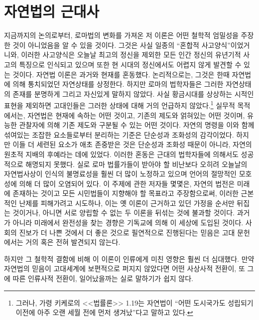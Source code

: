 \chapter{자연법의 근대사}

지금까지의 논의로부터, 로마법의 변화를 가져온 저 이론은 어떤 철학적 엄밀성을
주장한 것이 아니었음을 알 수 있을 것이다.
그것은 사실 일종의 ``혼합적 사고양식''이었거니와,
이러한 사고양식은 오늘날 최고의 정신을 제외한 모든 인간 정신의 유년기적 사고의
특징으로 인식되고 있으며 또한 현 시대의 정신에서도 어렵지 않게
발견할 수 있는 것이다.
자연법 이론은 과거와 현재를 혼동했다.
논리적으로는, 그것은 한때 자연법에 의해 통치되었던 자연상태를 상정한다.
하지만 로마의 법학자들은 그러한 자연상태의 존재를 분명하게 그리고
자신있게 말하지 않았다. 사실 황금시대를 상상하는 시적인 표현을
제외하면 고대인들은 그러한 상태에 대해 거의 언급하지 않았다.\footnote{%
  그러나, 가령 키케로의 <<법률론>> 1.19는 자연법이
  ``어떤 도시국가도 성립되기 이전에 아주 오랜 세월 전에 먼저
  생겨났''다고 말하고 있다. }
실무적 목적에서는, 자연법은 현재에 속하는 어떤 것이고,
기존의 제도와 얽혀있는 어떤 것이며, 유능한 관찰자에 의해
기존 제도와 구분될 수 있는 어떤 것이다.
자연의 명령을 이와 함께 섞여있는 조잡한 요소들로부터 분리하는 기준은
단순성과 조화성의 감각이었다.
하지만 이들 더 세련된 요소가 애초 존중받은 것은
단순성과 조화성 때문이 아니라,
자연의 원초적 지배의 후예라는 데에 있었다.
이러한 혼동은 근대의 법학자들에 의해서도 성공적으로 해명되지 못했다.
실로
로마 법률가들이 받아야 할 비난보다 오히려
오늘날의 자연법사상이 인식의 불명료성을 훨씬 더 많이 노정하고 있으며
언어의 절망적인 모호성에 의해 더 많이 오염되어 있다.
이 주제에 관한 저자들 몇몇은, 자연의 법전은 미래에 존재하는 것이고
모든 시민법들이 지향해야 할 목표라고 주장함으로써,
이러한 근본적인 난제를 피해가려고 시도하나,
이는 옛 이론이 근거하고 있던 가정을 순서만 뒤집는 것이거나,
아니면 서로 양립할 수 없는 두 이론을 뒤섞는 것에 불과할 것이다.
과거가 아니라 미래에서 완전성을 찾는 경향은 기독교에 의해
이 세상에 도입된 것이다.
사회의 진보가 더 나쁜 것에서 더 좋은 것으로 필연적으로 진행된다는 믿음은
고대 문헌에서는 거의 혹은 전혀 발견되지 않는다.

하지만 그 철학적 결함에 비해 이 이론이 인류에게 미친 영향은 훨씬 더 심대했다.
만약 자연법의 믿음이 고대세계에 보편적으로 퍼지지 않았다면
어떤 사상사적 전환이, 또 그에 따른 인류사적 전환이, 일어났을까는
실로 말하기가 쉽지 않다.

